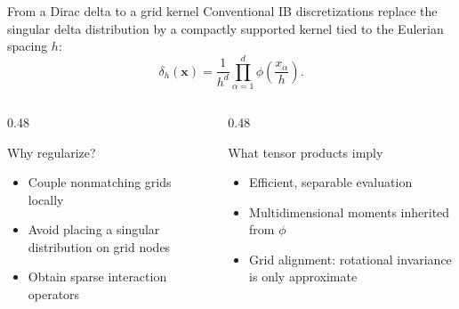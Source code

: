 \documentclass[aspectratio=169,11pt]{beamer}
\newcommand{\xvec}{\bm{x}}
\begin{document}
\begin{frame}{From a Dirac delta to a grid kernel}
Conventional IB discretizations replace the singular delta distribution by a compactly supported kernel tied to the Eulerian spacing \(h\):
\[
  \boxed{
  \delta_h(\xvec)
  =\frac{1}{h^{d}}
  \prod_{\alpha=1}^{d}
  \phi\!\left(\frac{x_{\alpha}}{h}\right).}
\]

\begin{columns}[T,onlytextwidth]
  \begin{column}{0.48\textwidth}
  \begin{block}{Why regularize?}
    \begin{itemize}
      \item Couple nonmatching grids locally
      \item Avoid placing a singular distribution on grid nodes
      \item Obtain sparse interaction operators
    \end{itemize}
  \end{block}
  \end{column}
  \begin{column}{0.48\textwidth}
  \begin{block}{What tensor products imply}
    \begin{itemize}
      \item Efficient, separable evaluation
      \item Multidimensional moments inherited from \(\phi\)
      \item Grid alignment: rotational invariance is only approximate
    \end{itemize}
  \end{block}
  \end{column}
\end{columns}

\end{frame}
\end{document}
